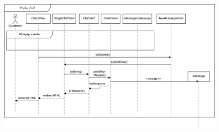 \eject \pdfpagewidth=10in \pdfpageheight=9in
\begin{figure}[ht!]
	\centering
	\includegraphics[scale=0.8]{figs/design-sequence/3-48.pdf}
\end{figure}
\FloatBarrier
\newpage





\recalctypearea
\newpage
